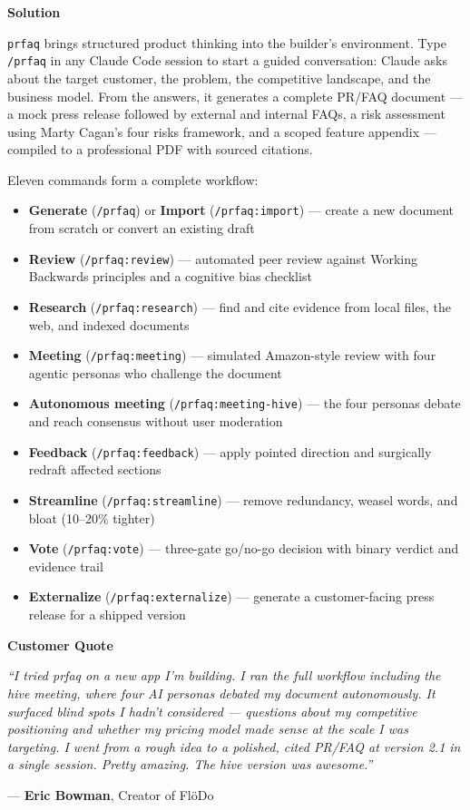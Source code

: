 \documentclass[11pt,letterpaper]{article}
\newcommand{\prsection}[1]{%
  \vspace{1em}%
  {\large\bfseries\color{SectionBlue}#1}%
  \vspace{0.3em}\par%
}
\begin{document}
\prsection{Solution}

\texttt{prfaq} brings structured product thinking into the builder's environment. Type \texttt{/prfaq} in any Claude Code session to start a guided conversation: Claude asks about the target customer, the problem, the competitive landscape, and the business model. From the answers, it generates a complete PR/FAQ document --- a mock press release followed by external and internal FAQs, a risk assessment using Marty Cagan's four risks framework, and a scoped feature appendix --- compiled to a professional PDF with sourced citations.

Eleven commands form a complete workflow:

\begin{itemize}[nosep]
  \item \textbf{Generate} (\texttt{/prfaq}) or \textbf{Import} (\texttt{/prfaq:import}) --- create a new document from scratch or convert an existing draft
  \item \textbf{Review} (\texttt{/prfaq:review}) --- automated peer review against Working Backwards principles and a cognitive bias checklist
  \item \textbf{Research} (\texttt{/prfaq:research}) --- find and cite evidence from local files, the web, and indexed documents
  \item \textbf{Meeting} (\texttt{/prfaq:meeting}) --- simulated Amazon-style review with four agentic personas who challenge the document
  \item \textbf{Autonomous meeting} (\texttt{/prfaq:meeting-hive}) --- the four personas debate and reach consensus without user moderation
  \item \textbf{Feedback} (\texttt{/prfaq:feedback}) --- apply pointed direction and surgically redraft affected sections
  \item \textbf{Streamline} (\texttt{/prfaq:streamline}) --- remove redundancy, weasel words, and bloat (10--20\% tighter)
  \item \textbf{Vote} (\texttt{/prfaq:vote}) --- three-gate go/no-go decision with binary verdict and evidence trail
  \item \textbf{Externalize} (\texttt{/prfaq:externalize}) --- generate a customer-facing press release for a shipped version
\end{itemize}

\prsection{Customer Quote}

\begin{customerquote}
\textit{``I tried prfaq on a new app I'm building. I ran the full workflow including the hive meeting, where four AI personas debated my document autonomously. It surfaced blind spots I hadn't considered --- questions about my competitive positioning and whether my pricing model made sense at the scale I was targeting. I went from a rough idea to a polished, cited PR/FAQ at version 2.1 in a single session. Pretty amazing. The hive version was awesome.''}

\raggedleft --- \textbf{Eric Bowman}, Creator of Fl\"{o}Do
\end{customerquote}
\end{document}
